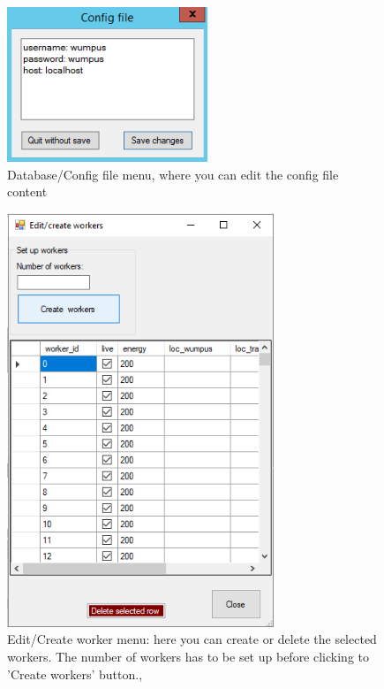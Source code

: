 \documentclass[a4paper,12pt]{article}
\begin{document}
\begin{figure}
	\begin{center}
		\includegraphics[width=6cm]{config.png}
		\caption{Database/Config file menu, where you can edit the config file content}
		\label{fig:config}
	\end{center}
\end{figure}

\begin{figure}
	\begin{center}
		\includegraphics[width=8cm]{menu_create_workers.png}
		\caption{Edit/Create worker menu: here you can create or delete the selected workers. The number of workers has to be set up before clicking to 'Create workers' button., }
		\label{fig:menu_create_workers}
	\end{center}
\end{figure}
\end{document}
